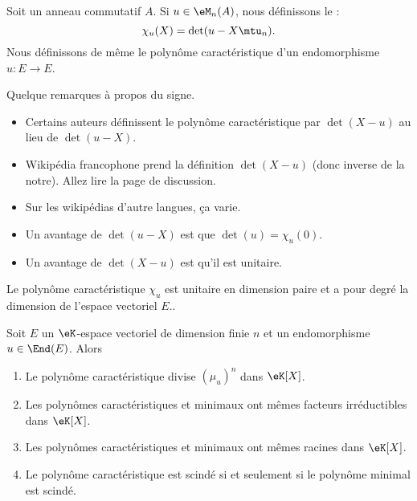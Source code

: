 \begin{definition}  \label{DefOWQooXbybYD}
    Soit un anneau commutatif \( A\). Si \( u\in\eM_n(A)\), nous définissons le  :
    \begin{equation}    \label{Eqkxbdfu}
        \chi_u(X)=\det(u-X\mtu_n).
    \end{equation} 
    Nous définissons de même le polynôme caractéristique d'un endomorphisme \( u\colon E\to E\).
\end{definition}

\begin{remark}
    Quelque remarques à propos du signe. 
    \begin{itemize}
        \item 
            Certains auteurs définissent le polynôme caractéristique par \( \det(X-u)\) au lieu de \( \det(u-X)\).
        \item
            Wikipédia francophone prend la définition \( \det(X-u)\) (donc inverse de la notre). Allez lire la page de discussion.
        \item
            Sur les wikipédias d'autre langues, ça varie.
        \item
            Un avantage de \( \det(u-X)\) est que \( \det(u)=\chi_u(0)\).
        \item
            Un avantage de \( \det(X-u)\) est qu'il est unitaire.
    \end{itemize}
\end{remark}

\begin{lemma}       \label{LemooWCZMooZqyaHd}
    Le polynôme caractéristique \( \chi_u\) est unitaire en dimension paire et a pour degré la dimension de l'espace vectoriel \( E\)..
\end{lemma}

\begin{theorem}     \label{ThoNhbrUL}
    Soit \( E\) un \(\eK\)-espace vectoriel de dimension finie \( n\) et un endomorphisme \( u\in\End(E)\). Alors
    \begin{enumerate}
        \item
            Le polynôme caractéristique divise \( (\mu_u)^n\) dans \(\eK[X]\).
        \item
            Les polynômes caractéristiques et minimaux ont mêmes facteurs irréductibles dans \(\eK[X]\).
        \item
            Les polynômes caractéristiques et minimaux ont mêmes racines dans \(\eK[X]\).
        \item
            Le polynôme caractéristique est scindé si et seulement si le polynôme minimal est scindé.
    \end{enumerate}
\end{theorem}

